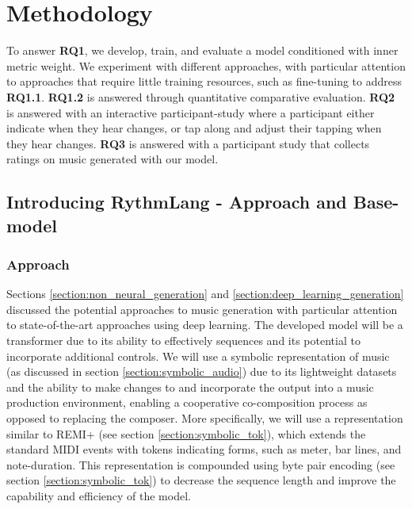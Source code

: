 \chapter{Methodology}
To answer \textbf{RQ1}, we develop, train, and evaluate a model conditioned with inner metric weight. We experiment with different approaches, with particular attention to approaches that require little training resources, such as fine-tuning to address \textbf{RQ1.1}. \textbf{RQ1.2} is answered through quantitative comparative evaluation.   
\textbf{RQ2} is answered with an interactive participant-study where a participant either indicate when they hear changes, or tap along and adjust their tapping when they hear changes. \textbf{RQ3} is answered with a participant study that collects ratings on music generated with our model. 

\section{Introducing RythmLang - Approach and Base-model}

\subsection{Approach}
Sections \ref{section:non_neural_generation} and \ref{section:deep_learning_generation} discussed the potential approaches to music generation with particular attention to state-of-the-art approaches using deep learning. The developed model will be a transformer due to its ability to effectively sequences and its potential to incorporate additional controls. We will use a symbolic representation of music (as discussed in section \ref{section:symbolic_audio}) due to its lightweight datasets and the ability to make changes to and incorporate the output into a music production environment, enabling a cooperative co-composition process as opposed to replacing the composer. More specifically, we will use a representation similar to REMI+ (see section \ref{section:symbolic_tok}), which extends the standard MIDI events with tokens indicating forms, such as meter, bar lines, and note-duration. This representation is compounded using byte pair encoding (see section \ref{section:symbolic_tok}) to decrease the sequence length and improve the capability and efficiency of the model. \\ 


